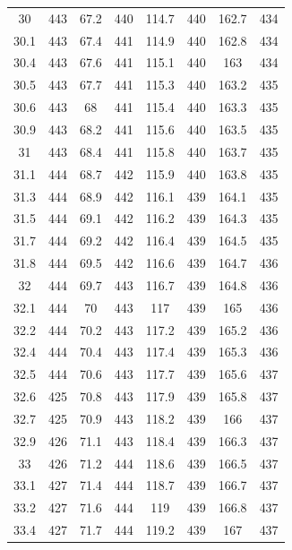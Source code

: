 \documentclass[12pt]{ctexart}
\numberwithin{equation}{section}
\begin{document}
\begin{longtable}{cc|cc|cc|cc}
30  &  443  &  67.2  &  440  &  114.7  &  440  &  162.7  &  434  \\
30.1  &  443  &  67.4  &  441  &  114.9  &  440  &  162.8  &  434  \\
30.4  &  443  &  67.6  &  441  &  115.1  &  440  &  163  &  434  \\
30.5  &  443  &  67.7  &  441  &  115.3  &  440  &  163.2  &  435  \\
30.6  &  443  &  68  &  441  &  115.4  &  440  &  163.3  &  435  \\
30.9  &  443  &  68.2  &  441  &  115.6  &  440  &  163.5  &  435  \\
31  &  443  &  68.4  &  441  &  115.8  &  440  &  163.7  &  435  \\
31.1  &  444  &  68.7  &  442  &  115.9  &  440  &  163.8  &  435  \\
31.3  &  444  &  68.9  &  442  &  116.1  &  439  &  164.1  &  435  \\
31.5  &  444  &  69.1  &  442  &  116.2  &  439  &  164.3  &  435  \\
31.7  &  444  &  69.2  &  442  &  116.4  &  439  &  164.5  &  435  \\
31.8  &  444  &  69.5  &  442  &  116.6  &  439  &  164.7  &  436  \\
32  &  444  &  69.7  &  443  &  116.7  &  439  &  164.8  &  436  \\
32.1  &  444  &  70  &  443  &  117  &  439  &  165  &  436  \\
32.2  &  444  &  70.2  &  443  &  117.2  &  439  &  165.2  &  436  \\
32.4  &  444  &  70.4  &  443  &  117.4  &  439  &  165.3  &  436  \\
32.5  &  444  &  70.6  &  443  &  117.7  &  439  &  165.6  &  437  \\
32.6  &  425  &  70.8  &  443  &  117.9  &  439  &  165.8  &  437  \\
32.7  &  425  &  70.9  &  443  &  118.2  &  439  &  166  &  437  \\
32.9  &  426  &  71.1  &  443  &  118.4  &  439  &  166.3  &  437  \\
33  &  426  &  71.2  &  444  &  118.6  &  439  &  166.5  &  437  \\
33.1  &  427  &  71.4  &  444  &  118.7  &  439  &  166.7  &  437  \\
33.2  &  427  &  71.6  &  444  &  119  &  439  &  166.8  &  437  \\
33.4  &  427  &  71.7  &  444  &  119.2  &  439  &  167  &  437  \\

\end{longtable}
\end{document}
